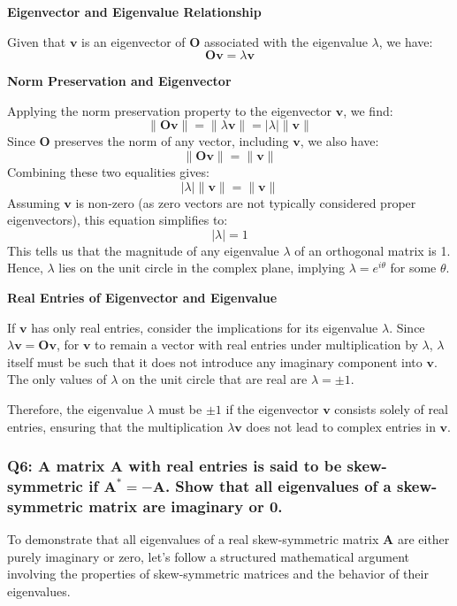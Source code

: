 \documentclass[8pt]{article}
\begin{document}
{\textbf{Eigenvector and Eigenvalue Relationship}

Given that \(\mathbf{v}\) is an eigenvector of \(\mathbf{O}\) associated with the eigenvalue \(\lambda\), we have:
\[
\mathbf{Ov} = \lambda \mathbf{v}
\]

\textbf{Norm Preservation and Eigenvector}

Applying the norm preservation property to the eigenvector \(\mathbf{v}\), we find:
\[
\|\mathbf{Ov}\| = \|\lambda \mathbf{v}\| = |\lambda| \|\mathbf{v}\|
\]
Since \(\mathbf{O}\) preserves the norm of any vector, including \(\mathbf{v}\), we also have:
\[
\|\mathbf{Ov}\| = \|\mathbf{v}\|
\]
Combining these two equalities gives:
\[
|\lambda| \|\mathbf{v}\| = \|\mathbf{v}\|
\]
Assuming \(\mathbf{v}\) is non-zero (as zero vectors are not typically considered proper eigenvectors), this equation simplifies to:
\[
|\lambda| = 1
\]
This tells us that the magnitude of any eigenvalue \(\lambda\) of an orthogonal matrix is 1. Hence, \(\lambda\) lies on the unit circle in the complex plane, implying \(\lambda = e^{i\theta}\) for some \(\theta\).

\textbf{Real Entries of Eigenvector and Eigenvalue}

If \(\mathbf{v}\) has only real entries, consider the implications for its eigenvalue \(\lambda\). Since \(\lambda \mathbf{v} = \mathbf{Ov}\), for \(\mathbf{v}\) to remain a vector with real entries under multiplication by \(\lambda\), \(\lambda\) itself must be such that it does not introduce any imaginary component into \(\mathbf{v}\). The only values of \(\lambda\) on the unit circle that are real are \(\lambda = \pm 1\).

Therefore, the eigenvalue \(\lambda\) must be \(\pm 1\) if the eigenvector \(\mathbf{v}\) consists solely of real entries, ensuring that the multiplication \(\lambda \mathbf{v}\) does not lead to complex entries in \(\mathbf{v}\).

\subsubsection*{Q6: A matrix \(\mathbf{A}\) with real entries is said to be skew-symmetric if \(\mathbf{A}^* = -\mathbf{A}\). Show that all eigenvalues of a skew-symmetric matrix are imaginary or 0.}

To demonstrate that all eigenvalues of a real skew-symmetric matrix \(\mathbf{A}\) are either purely imaginary or zero, let's follow a structured mathematical argument involving the properties of skew-symmetric matrices and the behavior of their eigenvalues.

}
\end{document}
